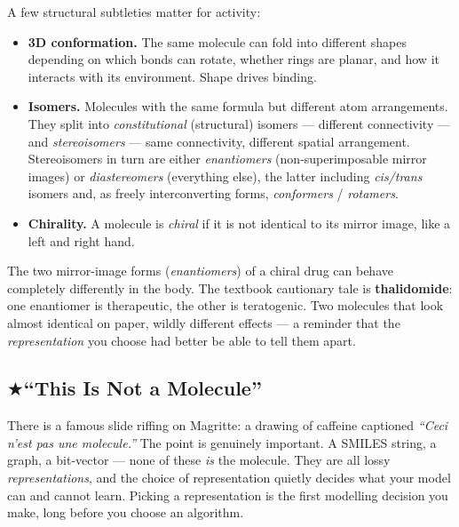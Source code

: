 \documentclass[11pt, oneside]{book}
\makeatletter
\newcommand{\starglyph}{\textcolor{stargold}{\ensuremath{\bigstar}}}
\newcommand{\starsec}[1]{%
  \texorpdfstring{\starglyph\hspace{0.4em}\textcolor{star@frame}{#1}}{#1}}
\makeatother
\begin{document}
A few structural subtleties matter for activity:

\begin{itemize}
  \item \textbf{3D conformation.} The same molecule can fold into different shapes
        depending on which bonds can rotate, whether rings are planar, and how it
        interacts with its environment. Shape drives binding.
  \item \textbf{Isomers.} Molecules with the same formula but different atom
        arrangements. They split into \emph{constitutional} (structural) isomers
        --- different connectivity --- and \emph{stereoisomers} --- same
        connectivity, different spatial arrangement. Stereoisomers in turn are
        either \emph{enantiomers} (non-superimposable mirror images) or
        \emph{diastereomers} (everything else), the latter including
        \emph{cis/trans} isomers and, as freely interconverting forms,
        \emph{conformers} / \emph{rotamers}.
  \item \textbf{Chirality.} A molecule is \emph{chiral} if it is not identical to
        its mirror image, like a left and right hand.
\end{itemize}

\begin{notebox}[title={Why chirality is not a technicality}]
The two mirror-image forms (\emph{enantiomers}) of a chiral drug can behave
completely differently in the body. The textbook cautionary tale is
\textbf{thalidomide}: one enantiomer is therapeutic, the other is teratogenic.
Two molecules that look almost identical on paper, wildly different effects ---
a reminder that the \emph{representation} you choose had better be able to tell
them apart.
\end{notebox}

\subsection{\starsec{``This Is Not a Molecule''}}

There is a famous slide riffing on Magritte: a drawing of caffeine captioned
\emph{``Ceci n'est pas une molecule.''} The point is genuinely important. A
SMILES string, a graph, a bit-vector --- none of these \emph{is} the molecule.
They are all lossy \emph{representations}, and the choice of representation
quietly decides what your model can and cannot learn. Picking a representation is
the first modelling decision you make, long before you choose an algorithm.
\end{document}
